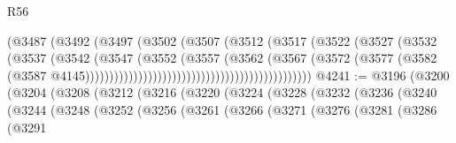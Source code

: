 \begin{lexlean}{R56}
\begin{coremodule}
{{{{{{{{{{{{{{{{{{{{{{{{{{{{{{{{{{{{{{{{{{{{{{{{{{{{{{{{{{{{{{{{{{{{{{{{{{{{{{{{{{{{{{{{{{{{{{{{{{{{{{{{{{{{{{{{{{{{{{{{{{{{{{{{{{{{{{{{{{{{{{{{{{{{{{{{{{{{{{{{{{{{{{{{{{{{{{{{{{{{{{{{{{{{{{{{{{{{{{{{{{{{{{{{{{{                                                        (@3487
                                                          (@3492
                                                            (@3497
                                                              (@3502
                                                                (@3507
                                                                  (@3512
                                                                    (@3517
                                                                      (@3522
                                                                        (@3527
                                                                          (@3532
                                                                            (@3537
                                                                              (@3542
                                                                                (@3547
                                                                                  (@3552
                                                                                    (@3557
                                                                                      (@3562
                                                                                        (@3567
                                                                                          (@3572
                                                                                            (@3577
                                                                                              (@3582
                                                                                                (@3587
                                                                                                  @4145)))))))))))))))))))))))))))))))))))))))))))))))
@4241 := @3196
    (@3200
      (@3204
        (@3208
          (@3212
            (@3216
              (@3220
                (@3224
                  (@3228
                    (@3232
                      (@3236
                        (@3240
                          (@3244
                            (@3248
                              (@3252
                                (@3256
                                  (@3261
                                    (@3266
                                      (@3271
                                        (@3276
                                          (@3281
                                            (@3286
                                              (@3291
}}}}}}}}}}}}}}}}}}}}}}}}}}}}}}}}}}}}}}}}}}}}}}}}}}}}}}}}}}}}}}}}}}}}}}}}}}}}}}}}}}}}}}}}}}}}}}}}}}}}}}}}}}}}}}}}}}}}}}}}}}}}}}}}}}}}}}}}}}}}}}}}}}}}}}}}}}}}}}}}}}}}}}}}}}}}}}}}}}}}}}}}}}}}}}}}}}}}}}}}}}}}}}}}}}}
\end{coremodule}
\end{lexlean}
